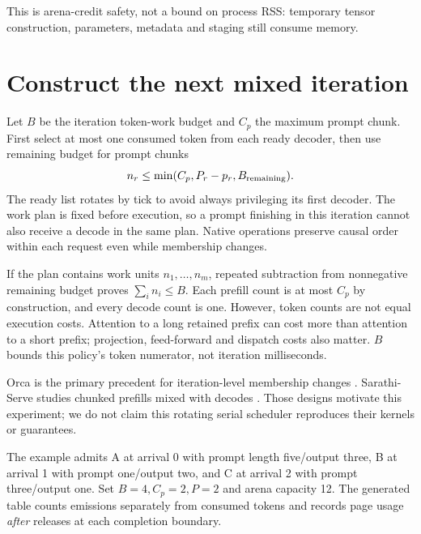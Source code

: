 This is arena-credit safety, not a bound on process RSS: temporary tensor
construction, parameters, metadata and staging still consume memory.

\section{Construct the next mixed iteration}
\label{evod37:schedule}
Let $B$ be the iteration token-work budget and $C_p$ the maximum prompt
chunk. First select at most one consumed token from each ready decoder,
then use remaining budget for prompt chunks
\[
 n_r\le\min(C_p,P_r-p_r,B_{\rm remaining}).
\]
The ready list rotates by tick to avoid always privileging its first decoder.
The work plan is fixed before execution, so a prompt finishing in this
iteration cannot also receive a decode in the same plan. Native operations
preserve causal order within each request even while membership changes.


If the plan contains work units $n_1,\ldots,n_m$, repeated subtraction
from nonnegative remaining budget proves $\sum_i n_i\le B$. Each prefill
count is at most $C_p$ by construction, and every decode count is one.
However, token counts are not equal execution costs. Attention to a long
retained prefix can cost more than attention to a short prefix; projection,
feed-forward and dispatch costs also matter. $B$ bounds this policy's
token numerator, not iteration milliseconds.

Orca is the primary precedent for iteration-level membership changes
\cite{evod37:orca}. Sarathi-Serve studies chunked prefills mixed with decodes
\cite{evod37:sarathi}. Those designs motivate this experiment; we do not
claim this rotating serial scheduler reproduces their kernels or guarantees.


The example admits A at arrival 0 with prompt length five/output three,
B at arrival 1 with prompt one/output two, and C at arrival 2 with prompt
three/output one. Set $B=4,C_p=2,P=2$ and arena capacity 12. The generated
table counts emissions separately from consumed tokens and records page
usage \emph{after} releases at each completion boundary.

